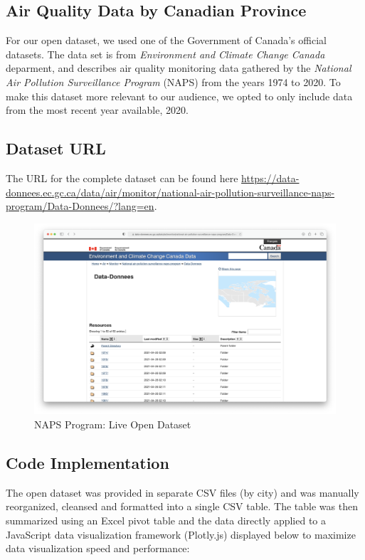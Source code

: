 \documentclass[12pt, letterpaper]{article}
\begin{document}
\subsection*{Air Quality Data by Canadian Province}
For our open dataset, we used one of the Government of Canada's official datasets. The data set is from \textit{Environment and Climate Change Canada} deparment, and describes air quality monitoring data gathered by the \textit{National Air Pollution Surveillance Program} (NAPS) from the years 1974 to 2020. To make this dataset more relevant to our audience, we opted to only include data from the most recent year available, 2020.

\subsection*{Dataset URL}
The URL for the complete dataset can be found here \url{https://data-donnees.ec.gc.ca/data/air/monitor/national-air-pollution-surveillance-naps-program/Data-Donnees/?lang=en}.

\begin{figure}[htbp]
	\centering
	\includegraphics[width=\textwidth]{images/21-1-opendataset.png}
	\caption{NAPS Program: Live Open Dataset}
 \end{figure}

\newpage

\subsection*{Code Implementation}
The open dataset was provided in separate CSV files (by city) and was manually reorganized, cleansed and formatted into a single CSV table. The table was then summarized using an Excel pivot table and the data directly applied to a JavaScript data visualization framework (Plotly.js) displayed below to maximize data visualization speed and performance:
\end{document}
